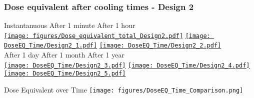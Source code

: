 \documentclass[xcolor={dvipsnames}]{beamer}
\begin{document}
\begin{frame}
  \frametitle{Dose equivalent after cooling times - Design 2}
  \hypertarget{coolingtimesprev_Design2}{}
  \centering
    \hspace*{1.2cm} Instantanuous \hfill After 1 minute \hfill After 1 hour \hspace*{1.5cm} \\
  \hyperlink{Dose_equivalent_Design2}{\texttt{[image: figures/Dose\_equivalent\_total\_Design2.pdf]}}
  \hyperlink{Dose_equivalent_minute_Design2}{\texttt{[image: DoseEQ\_Time/Design2\_1.pdf]}}
  \hyperlink{Dose_equivalent_hour_Design2}{\texttt{[image: DoseEQ\_Time/Design2\_2.pdf]}}\\
    \hspace*{1.2cm} After 1 day \hfill After 1 month \hfill After 1 year\hspace*{1.5cm} \\
  \hyperlink{Dose_equivalent_day_Design2}{\texttt{[image: DoseEQ\_Time/Design2\_3.pdf]}}
  \hyperlink{Dose_equivalent_month_Design2}{\texttt{[image: DoseEQ\_Time/Design2\_4.pdf]}}
  \hyperlink{Dose_equivalent_year_Design2}{\texttt{[image: DoseEQ\_Time/Design2\_5.pdf]}}
\end{frame}
\begin{frame}{Dose Equivalent over Time}
\centering
  \texttt{[image: figures/DoseEQ\_Time\_Comparison.png]}
\end{frame}

\end{document}
